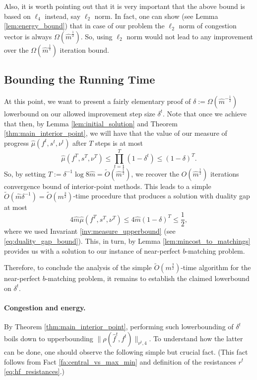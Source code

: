 \documentclass[11pt, letterpaper]{article}
\newcommand{\norm}[2]{\|#1\|_{#2}}
\newcommand{\tO}[1]{\widetilde{O}(#1)}
\newcommand{\hm}{\widehat{m}}
\newcommand{\cm}{{m}}
\newcommand{\hmu}{\hat{\mu}}
\newcommand{\vrho}{\boldsymbol{\mathit{\rho}}}
\newcommand{\vnu}{\boldsymbol{\mathit{\nu}}}
\newcommand{\bb}{\boldsymbol{\mathit{b}}}
\newcommand{\ff}{\boldsymbol{\mathit{f}}}
\newcommand{\hff}{\boldsymbol{\mathit{\hat{f}}}}
\newcommand{\rr}{\boldsymbol{\mathit{r}}}
\renewcommand{\ss}{\boldsymbol{\mathit{s}}}
\begin{document}
Also, it is worth pointing out that it is very important that the above bound is based on $\ell_4$ instead, say $\ell_2$ norm. In fact, one can show (see Lemma \ref{lem:energy_bound}) that in case of our problem the $\ell_2$ norm of congestion vector is always $\Omega(\hm^{\frac{1}{2}})$. So, using $\ell_2$ norm would not lead to any improvement over the $\Omega(\hm^{\frac{1}{2}})$ iteration bound. 


\subsection{Bounding the Running Time}


At this point, we want to present a fairly elementary proof of $\delta:=\Omega(\hm^{-\frac{1}{2}})$ lowerbound on our allowed improvement step size $\delta^t$. Note that once we achieve that then, by Lemma \ref{lem:initial_solution} and Theorem \ref{thm:main_interior_point}, we will have that the value of our measure of progress $\hmu(\ff^t,\ss^t,\vnu^t)$ after $T$ steps is at most
\[
\hmu(\ff^T,\ss^T,\vnu^T)\leq \prod_{t=1}^{T} (1-\delta^t) \leq (1-\delta)^T.
\]
So, by setting $T:=\delta^{-1} \log 8\hm=\tO{\hm^{\frac{1}{2}}}$, we recover the $O(\hm^{\frac{1}{2}})$ iterations convergence bound of interior-point methods. This leads to a simple $\tO{\hm \delta^{-1}}=\tO{\cm^{\frac{3}{2}}}$-time procedure that produces a solution with duality gap at most 
\[
4\hm \hmu(\ff^T,\ss^T,\vnu^T) \leq 4\hm (1-\delta)^T \leq \frac{1}{2},
\]
where we used Invariant \ref{inv:measure_upperbound} (see \eqref{eq:duality_gap_bound}). This, in turn, by Lemma \ref{lem:mincost_to_matchings} provides us with a solution to our instance of near-perfect $\bb$-matching problem. 

Therefore, to conclude the analysis of the simple $\tO{\cm^{\frac{3}{2}}}$-time algorithm for the near-perfect $\bb$-matching problem, it remains to establish the claimed lowerbound on $\delta^t$. 

\paragraph{Congestion and energy.} By Theorem \ref{thm:main_interior_point}, performing such lowerbounding of $\delta^t$ boils down to upperbounding $\norm{\vrho(\hff^t,\ff^t)}{\vnu^t,4}$. To understand how the latter can be done, one should observe the following simple but crucial fact. (This fact follows from Fact \ref{fa:central_vs_max_min} and definition of the resistances $\rr^t$ \eqref{eq:hf_resistances}.)
\end{document}
